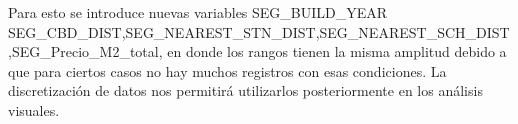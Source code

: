 \documentclass[
]{article}
\newenvironment{Shaded}{\begin{snugshade}}{\end{snugshade}}
\newcommand{\AttributeTok}[1]{\textcolor[rgb]{0.77,0.63,0.00}{#1}}
\newcommand{\DecValTok}[1]{\textcolor[rgb]{0.00,0.00,0.81}{#1}}
\newcommand{\FunctionTok}[1]{\textcolor[rgb]{0.00,0.00,0.00}{#1}}
\newcommand{\NormalTok}[1]{#1}
\newcommand{\OtherTok}[1]{\textcolor[rgb]{0.56,0.35,0.01}{#1}}
\newcommand{\SpecialCharTok}[1]{\textcolor[rgb]{0.00,0.00,0.00}{#1}}
\newcommand{\StringTok}[1]{\textcolor[rgb]{0.31,0.60,0.02}{#1}}
\begin{document}
Para esto se introduce nuevas variables SEG\_BUILD\_YEAR
SEG\_CBD\_DIST,SEG\_NEAREST\_STN\_DIST,SEG\_NEAREST\_SCH\_DIST,SEG\_Precio\_M2\_total,
en donde los rangos tienen la misma amplitud debido a que para ciertos
casos no hay muchos registros con esas condiciones. La discretización de
datos nos permitirá utilizarlos posteriormente en los análisis visuales.

\begin{Shaded}
\end{Shaded}
\end{document}
